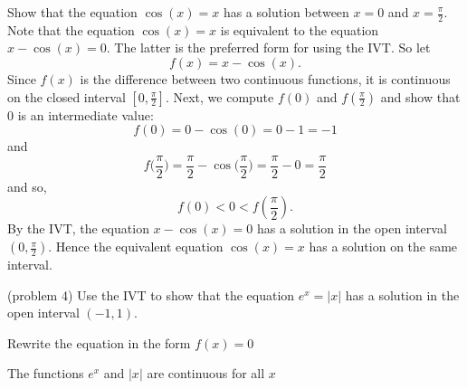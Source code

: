 \documentclass[handout]{ximera}
\begin{document}
\begin{example}[example 4]
Show that the equation $\cos(x) = x$ has a solution 
between $x = 0$ and $x = \frac{\pi}{2}$. \\
Note that the equation $\cos(x) = x$ is equivalent to the equation $x - \cos(x) =0$.
The latter is the preferred form for using the IVT.
So let 
\[f(x) = x - \cos(x).\] 
 Since $f(x)$ is the difference between two continuous functions,
it is continuous on the closed interval $[0, \frac{\pi}{2}]$. 
Next, we compute $f(0)$ and $f(\frac{\pi}{2})$ and show that 0 is an intermediate value:
\[f(0) = 0 - \cos(0) = 0-1 = -1 \]
and
\[f\big(\frac{\pi}{2}\big) = \frac{\pi}{2} - \cos\big(\frac{\pi}{2}\big) = \frac{\pi}{2}-0 = \frac{\pi}{2} \]
and so,
\[f(0) < 0 < f(\frac{\pi}{2}).\]
By the IVT, the equation $ x - \cos(x) =0$ has a solution in the open 
interval $(0, \frac{\pi}{2})$. Hence the equivalent equation $\cos(x) = x$ 
has a solution on the same interval.
\end{example}


\begin{problem}(problem 4)
Use the IVT to show that the equation $e^x = |x|$ has a solution in the open interval $(-1, 1)$.\\
\begin{hint}
Rewrite the equation in the form $f(x) = 0$
\end{hint}
\begin{hint}
The functions $e^x$ and $|x|$ are continuous for all $x$
\end{hint}
\end{problem}
\end{document}
